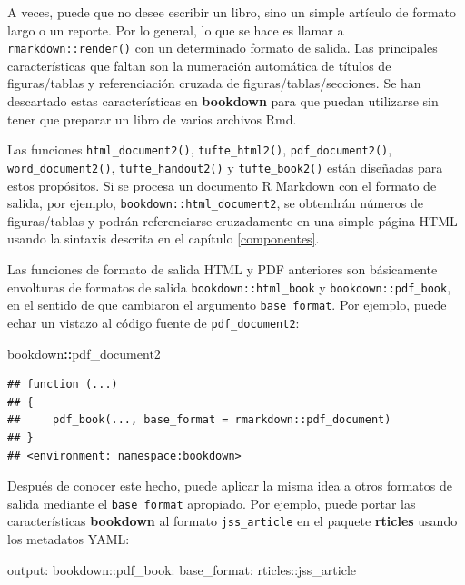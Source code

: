 \documentclass[12pt,]{krantz}
\makeatletter
\newenvironment{Shaded}{\begin{snugshade}}{\end{snugshade}}
\newcommand{\FunctionTok}[1]{\textcolor[rgb]{0.00,0.00,0.00}{#1}}
\newcommand{\OperatorTok}[1]{\textcolor[rgb]{0.81,0.36,0.00}{\textbf{#1}}}
\newcommand{\AttributeTok}[1]{\textcolor[rgb]{0.77,0.63,0.00}{#1}}
\newcommand{\NormalTok}[1]{#1}
\newenvironment{kframe}{%
\medskip{}
\setlength{\fboxsep}{.8em}
 \def\at@end@of@kframe{}%
 \ifinner\ifhmode%
  \def\at@end@of@kframe{\end{minipage}}%
  \begin{minipage}{\columnwidth}%
 \fi\fi%
 \def\FrameCommand##1{\hskip\@totalleftmargin \hskip-\fboxsep
 \colorbox{shadecolor}{##1}\hskip-\fboxsep
     \hskip-\linewidth \hskip-\@totalleftmargin \hskip\columnwidth}%
 \MakeFramed {\advance\hsize-\width
   \@totalleftmargin\z@ \linewidth\hsize
   \@setminipage}}%
 {\par\unskip\endMakeFramed%
 \at@end@of@kframe}
\renewenvironment{Shaded}{\begin{kframe}}{\end{kframe}}
\theoremstyle{definition}
\theoremstyle{definition}
\theoremstyle{definition}
\theoremstyle{remark}
\makeatother
\begin{document}
A veces, puede que no desee escribir un libro, sino un simple artículo
de formato largo o un reporte. Por lo general, lo que se hace es llamar
a \texttt{rmarkdown::render()} con un determinado formato de salida. Las
principales características que faltan son la numeración automática de
títulos de figuras/tablas y referenciación cruzada de
figuras/tablas/secciones. Se han descartado estas características en
\textbf{bookdown} para que puedan utilizarse sin tener que preparar un
libro de varios archivos Rmd.

Las funciones \texttt{html\_document2()}, \texttt{tufte\_html2()},
\texttt{pdf\_document2()}, \texttt{word\_document2()},
\texttt{tufte\_handout2()} y \texttt{tufte\_book2()} están diseñadas
para estos propósitos. Si se procesa un documento R Markdown con el
formato de salida, por ejemplo, \texttt{bookdown::html\_document2}, se
obtendrán números de figuras/tablas y podrán referenciarse cruzadamente
en una simple página HTML usando la sintaxis descrita en el capítulo
\ref{componentes}.

Las funciones de formato de salida HTML y PDF anteriores son básicamente
envolturas de formatos de salida \texttt{bookdown::html\_book} y
\texttt{bookdown::pdf\_book}, en el sentido de que cambiaron el
argumento \texttt{base\_format}. Por ejemplo, puede echar un vistazo al
código fuente de \texttt{pdf\_document2}:

\begin{Shaded}
\begin{Highlighting}[]
\NormalTok{bookdown}\OperatorTok{::}\NormalTok{pdf_document2}
\end{Highlighting}
\end{Shaded}

\begin{verbatim}
## function (...) 
## {
##     pdf_book(..., base_format = rmarkdown::pdf_document)
## }
## <environment: namespace:bookdown>
\end{verbatim}

Después de conocer este hecho, puede aplicar la misma idea a otros
formatos de salida mediante el \texttt{base\_format} apropiado. Por
ejemplo, puede portar las características \textbf{bookdown} al formato
\texttt{jss\_article} en el paquete \textbf{rticles} \citep{R-rticles}
usando los metadatos YAML:

\begin{Shaded}
\begin{Highlighting}[]
\FunctionTok{output:}
  \FunctionTok{bookdown:}\AttributeTok{:pdf_book:}
    \FunctionTok{base_format:}\AttributeTok{ rticles::jss_article}
\end{Highlighting}
\end{Shaded}
\end{document}
